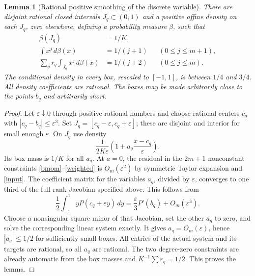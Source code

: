 \documentclass[11pt]{article}
\newtheorem{lemma}{Lemma}
\begin{document}
\begin{lemma}[Rational positive smoothing of the discrete variable]
There are disjoint rational closed intervals $J_q\subset(0,1)$ and a
positive affine density on each $J_q$, zero elsewhere, defining a
probability measure $\beta$, such that
\begin{align}
 \beta(J_q)&=1/K,\label{mass}\\
 \int x^j\,d\beta(x)&=1/(j+1) &&(0\le j\le m+1),\label{bmom}\\
 \sum_q r_q\int_{J_q}x^j\,d\beta(x)&=1/(j+2)
                                      &&(0\le j\le m).\label{weighted}
\end{align}
The conditional density in every box, rescaled to $[-1,1]$, is between
$1/4$ and $3/4$. All density coefficients are rational. The boxes may
be made arbitrarily close to the points $b_q$ and arbitrarily short.
\end{lemma}
\begin{proof}
Let $\varepsilon\downarrow0$ through positive rational numbers and
choose rational centers $c_q$ with $|c_q-b_q|\le\varepsilon^3$.
Set $J_q=[c_q-\varepsilon,c_q+\varepsilon]$; these are disjoint and
interior for small enough $\varepsilon$. On $J_q$ use density
\[
 \frac1{2K\varepsilon}
       \left(1+a_q\frac{x-c_q}{\varepsilon}\right).
\]
Its box mass is $1/K$ for all $a_q$.
At $a=0$, the residual in the $2m+1$ nonconstant constraints
\eqref{bmom}--\eqref{weighted} is $O_m(\varepsilon^2)$ by symmetric
Taylor expansion and \eqref{input}.
The coefficient matrix for the variables $a_q$, divided by
$\varepsilon$, converges to one third of the full-rank Jacobian
specified above. This follows from
\[
 \frac12\int_{-1}^1 yP(c_q+\varepsilon y)\,dy
     =\frac\varepsilon3P'(b_q)+O_m(\varepsilon^3).
\]
Choose a nonsingular square minor of that Jacobian, set the other
$a_q$ to zero, and solve the corresponding linear system exactly.
It gives $a_q=O_m(\varepsilon)$, hence $|a_q|\le1/2$ for sufficiently
small boxes. All entries of the actual system and its targets are
rational, so all $a_q$ are rational. The two degree-zero constraints
are already automatic from the box masses and $K^{-1}\sum r_q=1/2$.
This proves the lemma.
\end{proof}
\end{document}
